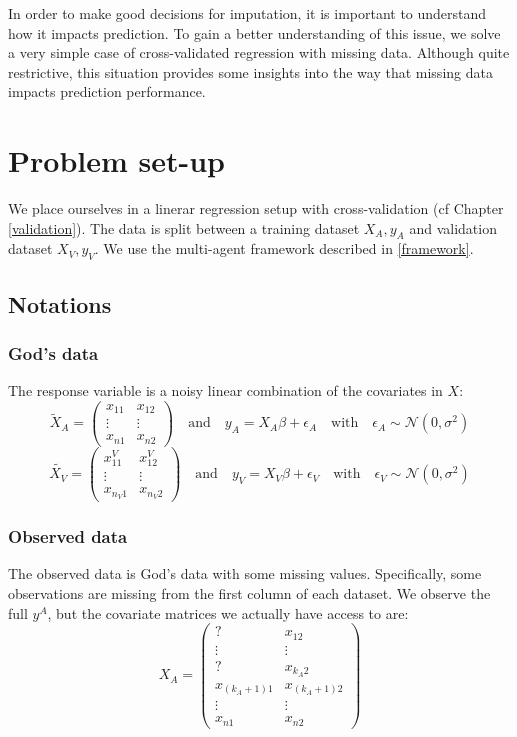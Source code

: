 In order to make good decisions for imputation, it is important to understand how it impacts prediction. To gain a better understanding of this issue, we solve a very simple case of cross-validated regression with missing data. Although quite restrictive, this situation provides some insights into the way that missing data impacts prediction performance.

	\section{Problem set-up}
We place ourselves in a linerar regression setup with cross-validation (cf Chapter \ref{validation}). The data is split between a training dataset $X_A, y_A$ and validation dataset $X_V, y_V$. We use the multi-agent framework described in \ref{framework}.
		\subsection{Notations}
			\subsubsection{God's data}
The response variable is a noisy linear combination of the covariates in $X$:
\begin{equation*}
\tilde{X}_A = 
\begin{pmatrix}
x_{11} & x_{12} \\
\vdots & \vdots \\
x_{n1} & x_{n2}
\end{pmatrix}
\quad \mathrm{and} \quad
y_A = X_A \beta + \epsilon_A
\quad \mathrm{with} \quad
\epsilon_A \sim \mathcal{N}(0, \sigma^2)
\end{equation*}
\begin{equation*}
\tilde{X_V} = 
\begin{pmatrix}
x_{11}^V & x_{12}^V \\
\vdots & \vdots \\
x_{n_V1} & x_{n_V2}
\end{pmatrix}
\quad \mathrm{and} \quad
y_V = X_V \beta + \epsilon_V
\quad \mathrm{with} \quad
\epsilon_V \sim \mathcal{N}(0, \sigma^2)
\end{equation*}

			\subsubsection{Observed data}
The observed data is God's data with some missing values. Specifically, some observations are missing from the first column of each dataset.  We observe the full $y^A$, but the covariate matrices we actually have access to are:
\begin{equation*}
X_A = 
\begin{pmatrix}
? & x_{12} \\
\vdots & \vdots \\
? & x_{k_A2} \\
x_{(k_A+1)1} & x_{(k_A+1)2}\\
\vdots & \vdots \\
x_{n1} & x_{n2}
\end{pmatrix}
\end{equation*}

